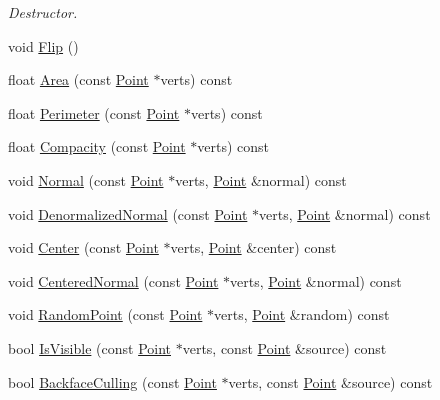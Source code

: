 \begin{DoxyCompactItemize}
\begin{DoxyCompactList}\small\item\em Destructor. \end{DoxyCompactList}\item 
void \hyperlink{classOpcode_1_1IndexedTriangle_a1f62befd6484bee954f067d5738c38a5}{Flip} ()
\item 
float \hyperlink{classOpcode_1_1IndexedTriangle_a726d46253ceaef9e3724d195374c1050}{Area} (const \hyperlink{classOpcode_1_1Point}{Point} $\ast$verts) const 
\item 
float \hyperlink{classOpcode_1_1IndexedTriangle_ab089bb99995ef572f42401d65868104f}{Perimeter} (const \hyperlink{classOpcode_1_1Point}{Point} $\ast$verts) const 
\item 
float \hyperlink{classOpcode_1_1IndexedTriangle_aa6fc9a36d7d895f5b23de439d7474e94}{Compacity} (const \hyperlink{classOpcode_1_1Point}{Point} $\ast$verts) const 
\item 
void \hyperlink{classOpcode_1_1IndexedTriangle_aec07600ca093248c4e49d02b3f2f7a36}{Normal} (const \hyperlink{classOpcode_1_1Point}{Point} $\ast$verts, \hyperlink{classOpcode_1_1Point}{Point} \&normal) const 
\item 
void \hyperlink{classOpcode_1_1IndexedTriangle_a6077f4cb876cdbbef181d4501d5b28f7}{Denormalized\+Normal} (const \hyperlink{classOpcode_1_1Point}{Point} $\ast$verts, \hyperlink{classOpcode_1_1Point}{Point} \&normal) const 
\item 
void \hyperlink{classOpcode_1_1IndexedTriangle_a773a19dac0e1b35913f94b8ec08f638d}{Center} (const \hyperlink{classOpcode_1_1Point}{Point} $\ast$verts, \hyperlink{classOpcode_1_1Point}{Point} \&center) const 
\item 
void \hyperlink{classOpcode_1_1IndexedTriangle_a307ff86b3dcb63701e4805ced9a21730}{Centered\+Normal} (const \hyperlink{classOpcode_1_1Point}{Point} $\ast$verts, \hyperlink{classOpcode_1_1Point}{Point} \&normal) const 
\item 
void \hyperlink{classOpcode_1_1IndexedTriangle_ad2fc2080a0d1ead335836991822eeca2}{Random\+Point} (const \hyperlink{classOpcode_1_1Point}{Point} $\ast$verts, \hyperlink{classOpcode_1_1Point}{Point} \&random) const 
\item 
bool \hyperlink{classOpcode_1_1IndexedTriangle_a6fc8b09c9cc16ce1e7c0b3fd825ddbf2}{Is\+Visible} (const \hyperlink{classOpcode_1_1Point}{Point} $\ast$verts, const \hyperlink{classOpcode_1_1Point}{Point} \&source) const 
\item 
bool \hyperlink{classOpcode_1_1IndexedTriangle_acac72a5c7e3a7e7963a9e9bc4ed2a3e8}{Backface\+Culling} (const \hyperlink{classOpcode_1_1Point}{Point} $\ast$verts, const \hyperlink{classOpcode_1_1Point}{Point} \&source) const 

\end{DoxyCompactItemize}
